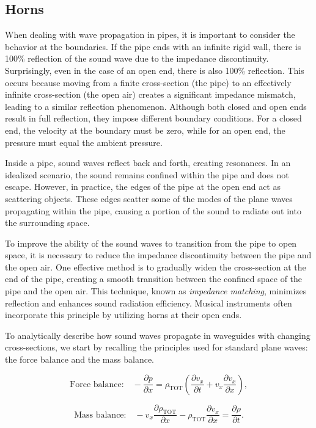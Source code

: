 \documentclass[a4paper]{article}
\begin{document}
\subsection{Horns}



When dealing with wave propagation in pipes, it is important to consider the behavior at the boundaries. If the pipe ends with an infinite rigid wall, there is 100\% reflection of the sound wave due to the impedance discontinuity. Surprisingly, even in the case of an open end, there is also 100\% reflection. This occurs because moving from a finite cross-section (the pipe) to an effectively infinite cross-section (the open air) creates a significant impedance mismatch, leading to a similar reflection phenomenon. Although both closed and open ends result in full reflection, they impose different boundary conditions. For a closed end, the velocity at the boundary must be zero, while for an open end, the pressure must equal the ambient pressure.

Inside a pipe, sound waves reflect back and forth, creating resonances. In an idealized scenario, the sound remains confined within the pipe and does not escape. However, in practice, the edges of the pipe at the open end act as scattering objects. These edges scatter some of the modes of the plane waves propagating within the pipe, causing a portion of the sound to radiate out into the surrounding space.


To improve the ability of the sound waves to transition from the pipe to open space, it is necessary to reduce the impedance discontinuity between the pipe and the open air. One effective method is to gradually widen the cross-section at the end of the pipe, creating a smooth transition between the confined space of the pipe and the open air. This technique, known as \emph{impedance matching}, minimizes reflection and enhances sound radiation efficiency. Musical instruments often incorporate this principle by utilizing horns at their open ends. 

To analytically describe how sound waves propagate in waveguides with changing cross-sections, we start by recalling the principles used for standard plane waves: the force balance and the mass balance. 


\[ \text{Force balance:} \quad
-\frac{\partial p}{\partial x} = \rho_\text{TOT} \left( \frac{\partial v_x}{\partial t} + v_x \frac{\partial v_x}{\partial x} \right),
\]


\[\text{Mass balance:} \quad
-v_x \frac{\partial \rho_\text{TOT}}{\partial x} - \rho_\text{TOT} \frac{\partial v_x}{\partial x} = \frac{\partial \rho}{\partial t}.
\]
\end{document}
